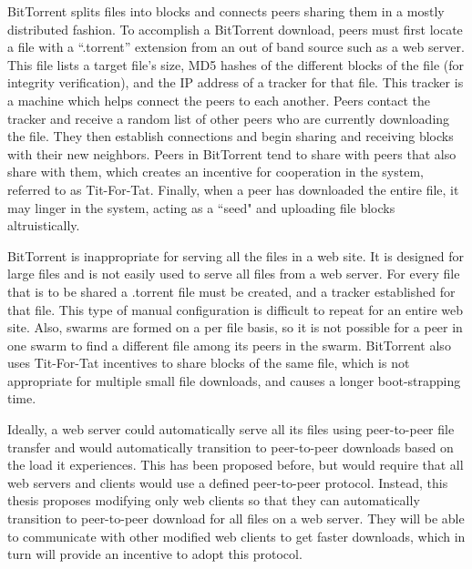 BitTorrent splits files into blocks and connects peers sharing them in a mostly distributed fashion.  To accomplish a BitTorrent download, peers must first locate a file with a ``.torrent'' extension from an out of band source such as a  web server.  This file lists a target file's size, MD5 hashes of the different blocks of the file (for integrity verification), and the IP address of a tracker for that file.  This tracker is a machine which helps connect the peers to each another.  Peers contact the tracker and receive a random list of other peers who are currently downloading the file.  They  then establish connections and begin sharing and receiving blocks with their new neighbors.  Peers in BitTorrent tend to share with peers that also share with them, which creates an incentive for cooperation in the system, referred to as Tit-For-Tat.  Finally, when a peer has downloaded the entire file, it may linger in the system, acting as a ``seed" and uploading file blocks altruistically. 



BitTorrent is inappropriate for serving all the files in a web site.  It is designed for large files and is not easily used to serve all files from a web server.  For every file that is to be shared a .torrent file must be created, and a tracker established for that file.  This type of manual configuration is difficult to repeat for an entire web site.  Also, swarms are formed on a per file basis, so it is not possible for a peer in one swarm to find a different file among its peers in the swarm.  BitTorrent also uses Tit-For-Tat incentives to share blocks of the same file, which is not appropriate for multiple small file downloads, and causes a longer boot-strapping time.  

Ideally, a web server could automatically serve all its files using peer-to-peer file transfer and would automatically transition to peer-to-peer downloads based on the load it experiences.  This has been proposed before, but would require that all web servers and clients would use a defined peer-to-peer protocol.  Instead, this thesis proposes modifying only web clients so that they can automatically transition to peer-to-peer download for all files on a web server.  They will be able to communicate with other modified web clients to get faster downloads, which in turn will provide an incentive to adopt this protocol.

